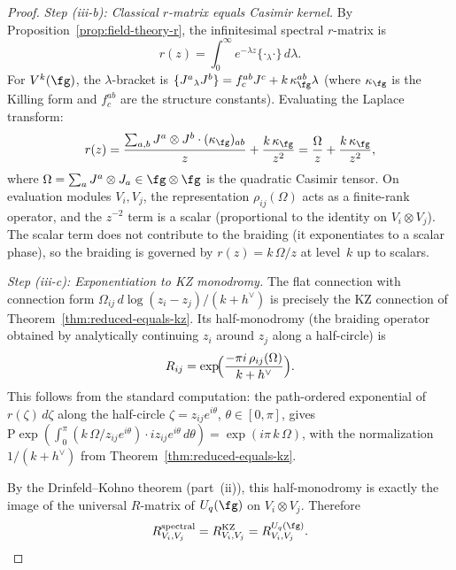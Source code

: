 \begin{proof}
\smallskip\noindent
\emph{Step (iii-b): Classical $r$-matrix equals Casimir kernel.}
By Proposition~\ref{prop:field-theory-r}, the infinitesimal
spectral $r$-matrix is
\[
 r(z) = \int_0^\infty e^{-\lambda z}
 \{\cdot{}_\lambda\cdot\}\, d\lambda.
\]
For $V^k(\fg)$, the $\lambda$-bracket is
$\{J^a {}_\lambda J^b\} = f^{ab}_c J^c + k\,\kappa_\fg^{ab}\lambda$
(where $\kappa_\fg$ is the Killing form and $f^{ab}_c$ are the
structure constants). Evaluating the Laplace transform:
\[
 r(z) = \frac{\sum_{a,b} J^a \otimes J^b \cdot (\kappa_\fg)_{ab}}{z}
 + \frac{k\,\kappa_\fg}{z^2}
 = \frac{\Omega}{z} + \frac{k\,\kappa_\fg}{z^2},
\]
where $\Omega = \sum_a J^a \otimes J_a \in \fg \otimes \fg$
is the quadratic Casimir tensor. On evaluation modules
$V_i, V_j$, the representation $\rho_{ij}(\Omega)$ acts as
a finite-rank operator, and the $z^{-2}$ term is a scalar
(proportional to the identity on $V_i \otimes V_j$). The
scalar term does not contribute to the braiding (it exponentiates
to a scalar phase), so the braiding is governed by
$r(z) = k\,\Omega/z$ at level~$k$ up to scalars.

\smallskip\noindent
\emph{Step (iii-c): Exponentiation to KZ monodromy.}
The flat connection with connection form
$\Omega_{ij}\, d\log(z_i - z_j)/(k + h^\vee)$ is precisely
the KZ connection of Theorem~\ref{thm:reduced-equals-kz}.
Its half-monodromy (the braiding operator obtained by
analytically continuing $z_i$ around $z_j$ along a half-circle)
is
\[
 R_{ij} = \exp\!\Bigl(\frac{-\pi i\, \rho_{ij}(\Omega)}
 {k + h^\vee}\Bigr).
\]
This follows from the standard computation: the
path-ordered exponential of $r(\zeta)\,d\zeta$ along the
half-circle $\zeta = z_{ij} e^{i\theta}$,
$\theta \in [0,\pi]$, gives
$\mathrm{P}\!\exp(\int_0^\pi (k\,\Omega/z_{ij} e^{i\theta})
\cdot iz_{ij} e^{i\theta}\, d\theta)
= \exp(i\pi\,k\, \Omega)$, with the normalization
$1/(k+h^\vee)$ from Theorem~\ref{thm:reduced-equals-kz}.

By the Drinfeld--Kohno theorem (part~(ii)), this half-monodromy
is exactly the image of the universal $R$-matrix of $U_q(\fg)$
on $V_i \otimes V_j$. Therefore
\[
 R_{V_i,V_j}^{\mathrm{spectral}}
 = R_{V_i,V_j}^{\mathrm{KZ}}
 = R_{V_i,V_j}^{U_q(\fg)}.
\]


\end{proof}
